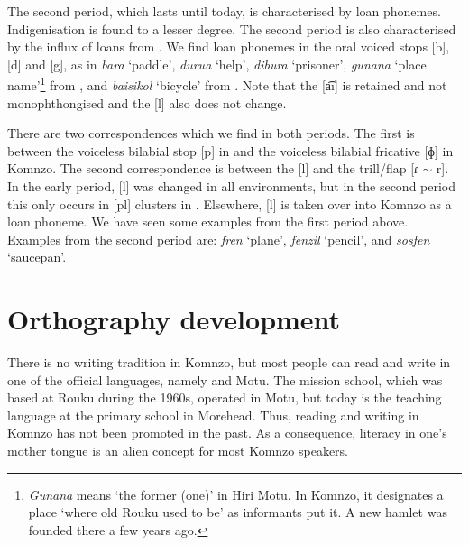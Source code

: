 The second period, which lasts until today, is characterised by loan phonemes. Indigenisation is found to a lesser degree. The second period is also characterised by the influx of loans from . We find loan phonemes in the oral voiced stops [b], [d] and [g], as in \emph{bara} `paddle', \emph{durua} `help', \emph{dibura} `prisoner', \emph{gunana} `place name'\footnote{\emph{Gunana} means `the former (one)' in Hiri Motu. In Komnzo, it designates a place `where old Rouku used to be' as informants put it. A new hamlet was founded there a few years ago.} from , and \emph{baisikol} `bicycle' from . Note that the   [a͡ı] is retained and not monophthongised and the   [l] also does not change.

There are two correspondences which we find in both periods. The first is between the voiceless bilabial stop [p] in  and the voiceless bilabial fricative [ɸ] in Komnzo. The second correspondence is between the   [l] and the  trill/flap [ɾ $\sim$ r]. In the early period, [l] was changed in all environments, but in the second period this only occurs in [pl] clusters in . Elsewhere, [l] is taken over into Komnzo as a loan phoneme. We have seen some examples from the first period above. Examples from the second period are: \emph{fren} `plane', \emph{fenzil} `pencil', and \emph{sosfen} `saucepan'.

\section{Orthography development}\label{orthographydev}

There is no writing tradition in Komnzo, but most people can read and write in one of the official languages, namely  and Motu. The mission school, which was based at Rouku during the 1960s, operated in Motu, but today  is the teaching language at the primary school in Morehead. Thus, reading and writing in Komnzo has not been promoted in the past. As a consequence, literacy in one's mother tongue is an alien concept for most Komnzo speakers.

